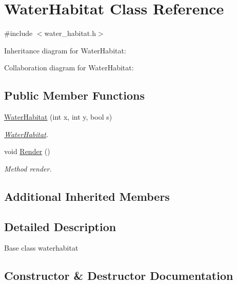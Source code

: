 \hypertarget{classWaterHabitat}{}\section{Water\+Habitat Class Reference}
\label{classWaterHabitat}


{\ttfamily \#include $<$water\+\_\+habitat.\+h$>$}



Inheritance diagram for Water\+Habitat\+:


Collaboration diagram for Water\+Habitat\+:
\subsection*{Public Member Functions}
\begin{DoxyCompactItemize}
\item 
\hyperlink{classWaterHabitat_af86ce59bbb950ef716cad385eacd5227}{Water\+Habitat} (int x, int y, bool s)
\begin{DoxyCompactList}\small\item\em \hyperlink{classWaterHabitat}{Water\+Habitat}. \end{DoxyCompactList}\item 
void \hyperlink{classWaterHabitat_abcd9e7dff3c25b78665979ef47fb4a7d}{Render} ()\hypertarget{classWaterHabitat_abcd9e7dff3c25b78665979ef47fb4a7d}{}\label{classWaterHabitat_abcd9e7dff3c25b78665979ef47fb4a7d}

\begin{DoxyCompactList}\small\item\em Method render. \end{DoxyCompactList}\end{DoxyCompactItemize}
\subsection*{Additional Inherited Members}


\subsection{Detailed Description}
Base class waterhabitat 

\subsection{Constructor \& Destructor Documentation}
